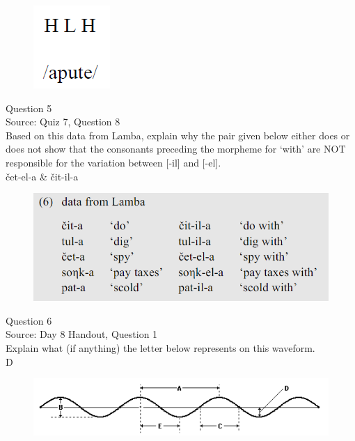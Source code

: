 \documentclass[12pt]{article}
\begin{document}
\begin{figure}[H]
\includegraphics{../images/mendetone_a.png}
\end{figure}

\newpage

{\large Question 5}\\

Source: Quiz 7, Question 8\\

Based on this data from Lamba, explain why the pair given below either does or does not show that the consonants preceding the morpheme for `with' are NOT responsible for the variation between [-il] and [-el].\\

čet-el-a \& čit-il-a

\begin{figure}[H]
\includegraphics{../images/peng119_lamba.png}
\end{figure}

\newpage

{\large Question 6}\\

Source: Day 8 Handout, Question 1\\

Explain what (if anything) the letter below represents on this waveform.\\

D

\begin{figure}[H]
\includegraphics{../images/sinusoid.png}
\end{figure}
\end{document}
